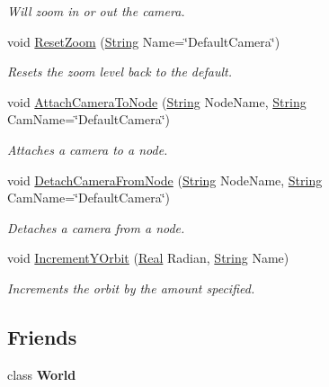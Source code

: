 \begin{DoxyCompactItemize}
\begin{DoxyCompactList}\small\item\em Will zoom in or out the camera. \item\end{DoxyCompactList}\item 
void \hyperlink{classphys_1_1CameraManager_a1cfaf4720fa9af7c0f234d6a2f26e179}{ResetZoom} (\hyperlink{namespacephys_aa03900411993de7fbfec4789bc1d392e}{String} Name=\char`\"{}DefaultCamera\char`\"{})
\begin{DoxyCompactList}\small\item\em Resets the zoom level back to the default. \item\end{DoxyCompactList}\item 
void \hyperlink{classphys_1_1CameraManager_a1cde365b6cab80a33ddf7046489f7af9}{AttachCameraToNode} (\hyperlink{namespacephys_aa03900411993de7fbfec4789bc1d392e}{String} NodeName, \hyperlink{namespacephys_aa03900411993de7fbfec4789bc1d392e}{String} CamName=\char`\"{}DefaultCamera\char`\"{})
\begin{DoxyCompactList}\small\item\em Attaches a camera to a node. \item\end{DoxyCompactList}\item 
void \hyperlink{classphys_1_1CameraManager_a5137bdb9dec706fa0fafec665d4f71c8}{DetachCameraFromNode} (\hyperlink{namespacephys_aa03900411993de7fbfec4789bc1d392e}{String} NodeName, \hyperlink{namespacephys_aa03900411993de7fbfec4789bc1d392e}{String} CamName=\char`\"{}DefaultCamera\char`\"{})
\begin{DoxyCompactList}\small\item\em Detaches a camera from a node. \item\end{DoxyCompactList}\item 
void \hyperlink{classphys_1_1CameraManager_a82001f0874a090717ced3fbe78ce795b}{IncrementYOrbit} (\hyperlink{namespacephys_af7eb897198d265b8e868f45240230d5f}{Real} Radian, \hyperlink{namespacephys_aa03900411993de7fbfec4789bc1d392e}{String} Name)
\begin{DoxyCompactList}\small\item\em Increments the orbit by the amount specified. \item\end{DoxyCompactList}\end{DoxyCompactItemize}
\subsection*{Friends}
\begin{DoxyCompactItemize}
\item 
\hypertarget{classphys_1_1CameraManager_a7b4bcdf992c21ae83363f25df05b1d25}{
class {\bfseries World}}
\label{d9/d91/classphys_1_1CameraManager_a7b4bcdf992c21ae83363f25df05b1d25}

\end{DoxyCompactItemize}


